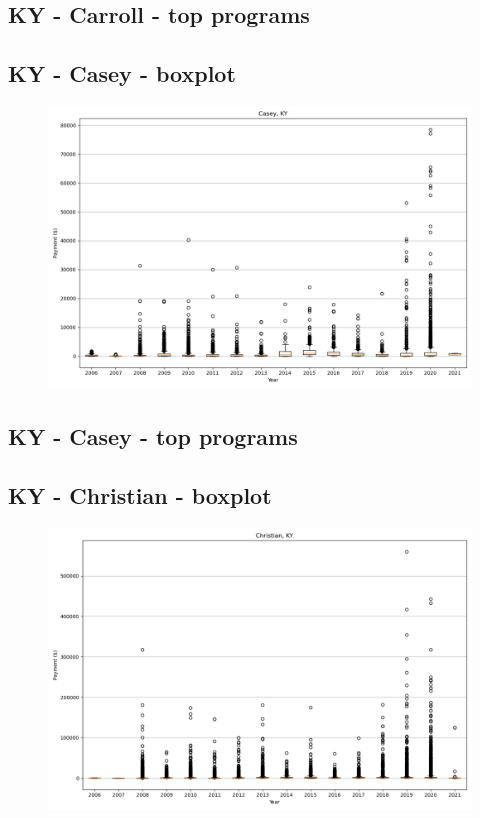\subsection*{KY - Carroll - top programs}

\newpage
\subsection*{KY - Casey - boxplot}
\begin{figure}[h]
\centering
\includegraphics[width=7in]{../output/boxplots/counties/Casey-KY_boxplot.png}
\end{figure}


\subsection*{KY - Casey - top programs}

\newpage
\subsection*{KY - Christian - boxplot}
\begin{figure}[h]
\centering
\includegraphics[width=7in]{../output/boxplots/counties/Christian-KY_boxplot.png}
\end{figure}


